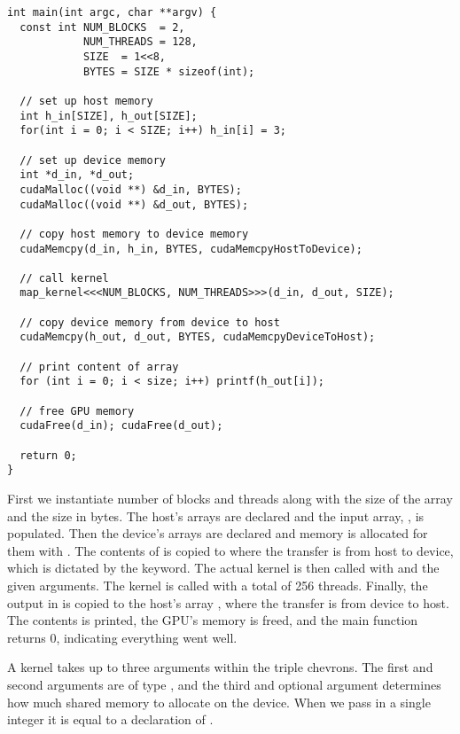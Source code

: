 \begin{lstlisting}[caption={Calling a kernel}, label={lst:kernel call example}]
int main(int argc, char **argv) {
  const int NUM_BLOCKS  = 2, 
            NUM_THREADS = 128, 
            SIZE  = 1<<8,
            BYTES = SIZE * sizeof(int);

  // set up host memory
  int h_in[SIZE], h_out[SIZE];
  for(int i = 0; i < SIZE; i++) h_in[i] = 3;

  // set up device memory
  int *d_in, *d_out;
  cudaMalloc((void **) &d_in, BYTES);
  cudaMalloc((void **) &d_out, BYTES);

  // copy host memory to device memory
  cudaMemcpy(d_in, h_in, BYTES, cudaMemcpyHostToDevice);

  // call kernel
  map_kernel<<<NUM_BLOCKS, NUM_THREADS>>>(d_in, d_out, SIZE);

  // copy device memory from device to host
  cudaMemcpy(h_out, d_out, BYTES, cudaMemcpyDeviceToHost);

  // print content of array
  for (int i = 0; i < size; i++) printf(h_out[i]);

  // free GPU memory
  cudaFree(d_in); cudaFree(d_out);

  return 0;
}
\end{lstlisting}

First we instantiate number of blocks and threads along with the size of the array and the size in bytes.
The host's arrays are declared and the input array, , is populated.
Then the device's arrays are declared and memory is allocated for them with .
The contents of  is copied to  where the transfer is from host to device, which is dictated by the  keyword.
The actual kernel is then called with  and the given arguments.
The kernel is called with a total of 256 threads.
Finally, the output in  is copied to the host's array , where the transfer is from device to host.
The contents is printed, the GPU's memory is freed, and the main function returns 0, indicating everything went well.

A kernel takes up to three arguments within the triple chevrons.
The first and second arguments are of type , and the third and optional argument determines how much shared memory to allocate on the device.
When we pass in a single integer it is equal to a declaration of .
